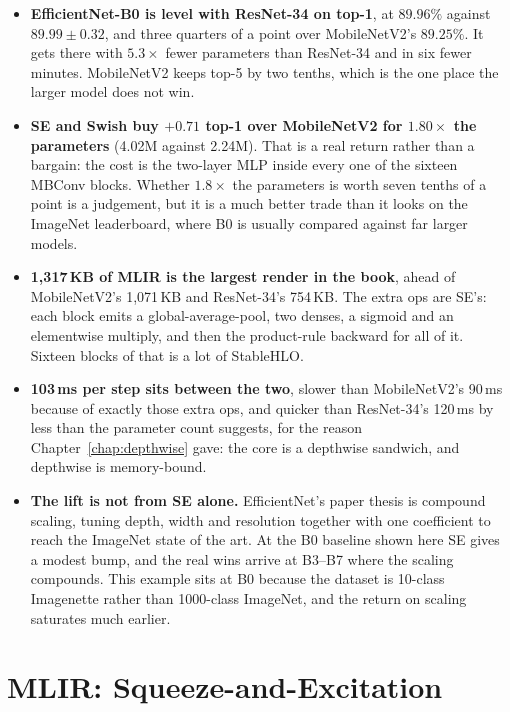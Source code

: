 \begin{itemize}
\item \textbf{EfficientNet-B0 is level with ResNet-34 on top-1}, at
  $89.96\%$ against $89.99 \pm 0.32$, and three quarters of a point over
  MobileNetV2's $89.25\%$. It gets there with $5.3\times$ fewer parameters
  than ResNet-34 and in six fewer minutes. MobileNetV2 keeps top-5 by two
  tenths, which is the one place the larger model does not win.

\item \textbf{SE and Swish buy $+0.71$ top-1 over MobileNetV2 for
  $1.80\times$ the parameters} (4.02M against 2.24M). That is a real
  return rather than a bargain: the cost is the two-layer MLP inside
  every one of the sixteen MBConv blocks. Whether $1.8\times$ the
  parameters is worth seven tenths of a point is a judgement, but it is a
  much better trade than it looks on the ImageNet leaderboard, where B0
  is usually compared against far larger models.

\item \textbf{1{,}317\,KB of MLIR is the largest render in the book},
  ahead of MobileNetV2's 1{,}071\,KB and ResNet-34's 754\,KB. The extra
  ops are SE's: each block emits a global-average-pool, two denses, a
  sigmoid and an elementwise multiply, and then the product-rule backward
  for all of it. Sixteen blocks of that is a lot of StableHLO.

\item \textbf{103\,ms per step sits between the two}, slower than
  MobileNetV2's 90\,ms because of exactly those extra ops, and quicker
  than ResNet-34's 120\,ms by less than the parameter count suggests,
  for the reason Chapter~\ref{chap:depthwise} gave: the core is a
  depthwise sandwich, and depthwise is memory-bound.

\item \textbf{The lift is not from SE alone.} EfficientNet's paper thesis
  is compound scaling, tuning depth, width and resolution together
  with one coefficient to reach the ImageNet state of the art. At the B0
  baseline shown here SE gives a modest bump, and the real wins arrive at
  B3--B7 where the scaling compounds. This example sits at B0 because the
  dataset is 10-class Imagenette rather than 1000-class ImageNet, and the
  return on scaling saturates much earlier.
\end{itemize}

\section{MLIR: Squeeze-and-Excitation}

